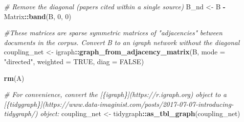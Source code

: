 \documentclass[
11pt, %
oneside, %
english, %
singlespacing, %
]{macthesis} %
\newenvironment{Shaded}{\begin{snugshade}}{\end{snugshade}}
\newcommand{\AttributeTok}[1]{\textcolor[rgb]{0.13,0.29,0.53}{#1}}
\newcommand{\CommentTok}[1]{\textcolor[rgb]{0.56,0.35,0.01}{\textit{#1}}}
\newcommand{\ConstantTok}[1]{\textcolor[rgb]{0.56,0.35,0.01}{#1}}
\newcommand{\DecValTok}[1]{\textcolor[rgb]{0.00,0.00,0.81}{#1}}
\newcommand{\FunctionTok}[1]{\textcolor[rgb]{0.13,0.29,0.53}{\textbf{#1}}}
\newcommand{\NormalTok}[1]{#1}
\newcommand{\OtherTok}[1]{\textcolor[rgb]{0.56,0.35,0.01}{#1}}
\newcommand{\SpecialCharTok}[1]{\textcolor[rgb]{0.81,0.36,0.00}{\textbf{#1}}}
\newcommand{\StringTok}[1]{\textcolor[rgb]{0.31,0.60,0.02}{#1}}
\begin{document}
\begin{Shaded}
\begin{Highlighting}[]
\CommentTok{\# Remove the diagonal (papers cited within a single source)}
\NormalTok{B\_nd }\OtherTok{\textless{}{-}}\NormalTok{ B }\SpecialCharTok{{-}}\NormalTok{ Matrix}\SpecialCharTok{::}\FunctionTok{band}\NormalTok{(B, }\DecValTok{0}\NormalTok{, }\DecValTok{0}\NormalTok{)}
\end{Highlighting}
\end{Shaded}

\begin{Shaded}
\begin{Highlighting}[]
\CommentTok{\#These matrices are sparse symmetric matrices of "adjacencies" between documents in the corpus. Convert \textasciigrave{}B\textasciigrave{} to an \textasciigrave{}igraph\textasciigrave{} network without the diagonal}
\NormalTok{coupling\_net }\OtherTok{\textless{}{-}}\NormalTok{ igraph}\SpecialCharTok{::}\FunctionTok{graph\_from\_adjacency\_matrix}\NormalTok{(B, }
                                            \AttributeTok{mode =} \StringTok{"directed"}\NormalTok{, }
                                            \AttributeTok{weighted =} \ConstantTok{TRUE}\NormalTok{,}
                                            \AttributeTok{diag =} \ConstantTok{FALSE}\NormalTok{)}
\end{Highlighting}
\end{Shaded}

\begin{Shaded}
\begin{Highlighting}[]
\FunctionTok{rm}\NormalTok{(A)}
\end{Highlighting}
\end{Shaded}

\begin{Shaded}
\begin{Highlighting}[]
\CommentTok{\# For convenience, convert the [\{igraph\}](https://r.igraph.org) object to a [\{tidygraph\}](https://www.data{-}imaginist.com/posts/2017{-}07{-}07{-}introducing{-}tidygraph/) object:}
\NormalTok{coupling\_net }\OtherTok{\textless{}{-}}\NormalTok{ tidygraph}\SpecialCharTok{::}\FunctionTok{as\_tbl\_graph}\NormalTok{(coupling\_net)}
\end{Highlighting}
\end{Shaded}
\end{document}
